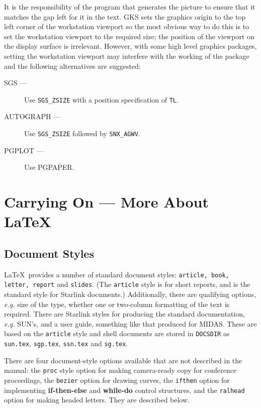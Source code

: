 It is the responsibility of the program that generates the picture to ensure
that it matches the gap left for it in the text.
GKS sets the graphics origin to the top left corner of the workstation viewport
so the most obvious way to do this is to set the workstation viewport to
the required size; the position of the viewport on the display surface is
irrelevant. 
However, with some high level graphics packages, setting the
workstation viewport may interfere with the working of the package and the
following alternatives are suggested:
\begin{description}
\item[SGS ---] Use {\tt SGS\_ZSIZE} with a position specification of {\tt TL}.
\item[AUTOGRAPH ---] Use {\tt SGS\_ZSIZE} followed by {\tt SNX\_AGWV}.
\item[PGPLOT ---] Use PGPAPER.
\end{description}


\section{Carrying On --- More About \LaTeX}
\label{se:carryon}



\subsection{Document Styles}
\label{se:dstyle}
\LaTeX\ provides a number of standard document styles:
{\tt article, book, letter, report} and \mbox{\tt slides}. 
(The \mbox{\tt article} style is for short reports, and is the standard style
for Starlink documents.)  
Additionally, there are qualifying options, {\em e.g.} size of the type, 
whether one or two-column formatting of the text is required.
There are Starlink styles for producing the standard documentation, {\em e.g.} 
SUN's, and a user guide, something like that produced for MIDAS. These are
based on the \mbox{\tt article} style and shell documents are stored in
\verb+DOCSDIR+ as \verb+sun.tex+, \verb+sgp.tex+, \verb+ssn.tex+ and \verb+sg.tex+.

There are four document-style options available  that are not described in the
manual: the \mbox{\tt proc} style option for making camera-ready copy for
conference proceedings, the \mbox{\tt bezier} option for drawing curves, the
\mbox{\tt ifthen} option for implementing {\bf if-then-else} and {\bf while-do}
control structures, and the \mbox{\tt ralhead} option for making headed
letters.  They are described below. 

